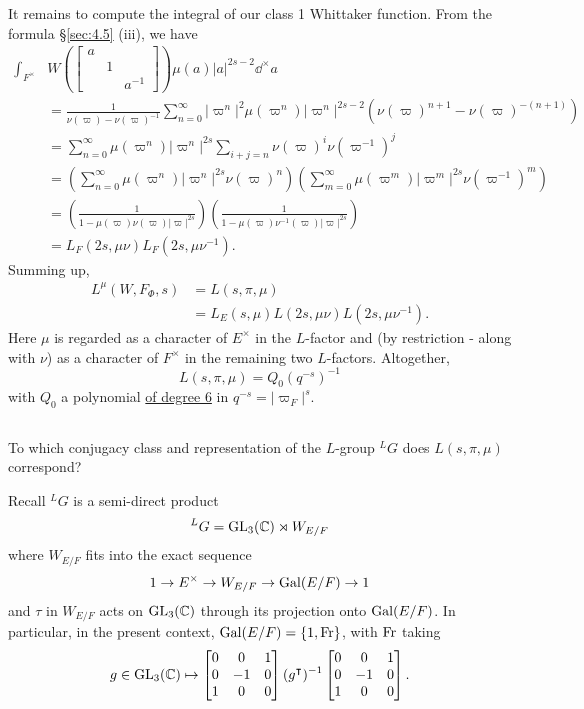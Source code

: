 It remains to compute the integral of our class 1 Whittaker function. 
From the formula \S \ref{sec:4.5} (iii), we have
\begin{align*}
    \int_{F^\times} &W\left(\begin{bmatrix}
        a & & \\ & 1 & \\ & & a^{-1}
    \end{bmatrix}\right) \mu(a) |a|^{2s-2} \dd^\times a \\
    &= \frac{1}{\nu(\varpi) - \nu(\varpi)^{-1}} \sum_{n=0}^{\infty} |\varpi^n|^2 \mu(\varpi^n) |\varpi^n|^{2s-2} (\nu(\varpi)^{n+1} - \nu(\varpi)^{-(n+1)}) \\
    &= \sum_{n=0}^{\infty} \mu(\varpi^n) |\varpi^n|^{2s} \sum_{i+j=n} \nu(\varpi)^i \nu(\varpi^{-1})^{j} \\
    &= \left(\sum_{n=0}^{\infty}\mu(\varpi^n)|\varpi^n|^{2s}\nu(\varpi)^n\right) \left(\sum_{m=0}^{\infty} \mu(\varpi^m) |\varpi^m|^{2s} \nu(\varpi^{-1})^{m}\right) \\
    &= \left(\frac{1}{1 - \mu(\varpi)\nu(\varpi)|\varpi|^{2s}}\right)\left(\frac{1}{1 - \mu(\varpi)\nu^{-1}(\varpi)|\varpi|^{2s}}\right) \\
    &= L_F(2s,\mu\nu) L_F(2s, \mu\nu^{-1}).
\end{align*}
Summing up,
\begin{align*}
    L^\mu(W, F_\Phi, s) &= L(s, \pi, \mu)\\
    &= L_E(s, \mu) L(2s, \mu\nu) L(2s, \mu \nu^{-1}).
\end{align*}
Here $\mu$ is regarded as a character of $E^\times$ in the $L$-factor and (by restriction - along with $\nu$) as a character of $F^\times$ in the remaining two $L$-factors. Altogether,
\[
    L(s, \pi, \mu) = Q_0(q^{-s})^{-1}
\]
with $Q_0$ a polynomial \underline{of degree 6} in $q^{-s} = |\varpi_F|^s$.


\subsection{}
\label{sec:4.8}

To which conjugacy class and representation of the $L$-group ${}^L G$ does $L(s, \pi, \mu)$ correspond?

Recall ${}^L G$ is a semi-direct product
\[
    {}^L G = \mathrm{GL}_3(\mathbb{C}) \rtimes W_{E/F}
\]
where $W_{E/F}$ fits into the exact sequence
\[
    1 \to E^\times \to W_{E/F} \to \mathrm{Gal}(E/F) \to 1
\]
and $\tau$ in $W_{E/F}$ acts on $\mathrm{GL}_3(\mathbb{C})$ through its projection onto $\mathrm{Gal}(E/F)$.
In particular, in the present context, $\mathrm{Gal}(E/F) = \{1, \mathrm{Fr}\}$, with $\mathrm{Fr}$ taking
\[
    g \in \mathrm{GL}_3(\mathbb{C}) \mapsto \begin{bmatrix}
        0 & 0 & 1 \\ 0 & -1 & 0 \\ 1 & 0 & 0
    \end{bmatrix} (g^\intercal)^{-1} \begin{bmatrix}
        0 & 0 & 1 \\ 0 & -1 & 0 \\ 1 & 0 & 0
    \end{bmatrix}.
\]

